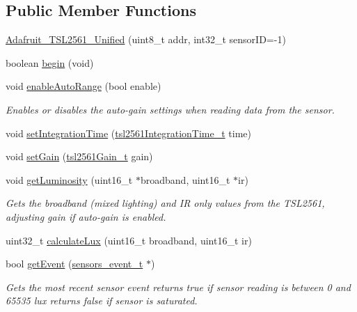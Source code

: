 \subsection*{Public Member Functions}
\begin{DoxyCompactItemize}
\item 
\hyperlink{class_adafruit___t_s_l2561___unified_abd81c1ca2c46e4d8b9c3f4460a65aa3f}{Adafruit\+\_\+\+T\+S\+L2561\+\_\+\+Unified} (uint8\+\_\+t addr, int32\+\_\+t sensor\+ID=-\/1)
\item 
boolean \hyperlink{class_adafruit___t_s_l2561___unified_ac2781d263ae73533628d5844ca38b6de}{begin} (void)
\item 
void \hyperlink{class_adafruit___t_s_l2561___unified_a9bb93fc9a1af24175c9838cdfe7b8904}{enable\+Auto\+Range} (bool enable)
\begin{DoxyCompactList}\small\item\em Enables or disables the auto-\/gain settings when reading data from the sensor. \end{DoxyCompactList}\item 
void \hyperlink{class_adafruit___t_s_l2561___unified_a594636810e6e26dc025b7f1b7a16024f}{set\+Integration\+Time} (\hyperlink{_adafruit___t_s_l2561___u_8h_a541f87fb512c1fd213e23c3a8b23264a}{tsl2561\+Integration\+Time\+\_\+t} time)
\item 
void \hyperlink{class_adafruit___t_s_l2561___unified_ad4189a1cb97b07366b5014bec629f29a}{set\+Gain} (\hyperlink{_adafruit___t_s_l2561___u_8h_a8051d9eb664d757f67c0c5ce371cd9d0}{tsl2561\+Gain\+\_\+t} gain)
\item 
void \hyperlink{class_adafruit___t_s_l2561___unified_a23378e7c4792b8b8c721d5a4def960fb}{get\+Luminosity} (uint16\+\_\+t $\ast$broadband, uint16\+\_\+t $\ast$ir)
\begin{DoxyCompactList}\small\item\em Gets the broadband (mixed lighting) and IR only values from the T\+S\+L2561, adjusting gain if auto-\/gain is enabled. \end{DoxyCompactList}\item 
uint32\+\_\+t \hyperlink{class_adafruit___t_s_l2561___unified_a5059ebabcbd037d53459ec9f3c6cdc4b}{calculate\+Lux} (uint16\+\_\+t broadband, uint16\+\_\+t ir)
\item 
bool \hyperlink{class_adafruit___t_s_l2561___unified_a6a133ea86b7a7158408519214c4d0aef}{get\+Event} (\hyperlink{_adafruit___sensor_8h_structsensors__event__t}{sensors\+\_\+event\+\_\+t} $\ast$)
\begin{DoxyCompactList}\small\item\em Gets the most recent sensor event returns true if sensor reading is between 0 and 65535 lux returns false if sensor is saturated. \end{DoxyCompactList}\item 

\end{DoxyCompactItemize}
